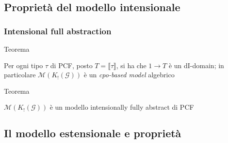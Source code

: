 \documentclass{beamer}
\begin{document}
\subsection{Proprietà del modello intensionale}

\begin{frame}
	
	\frametitle{Intensional full abstraction}
	
	
	\begin{block}{Teorema}
		
		Per ogni tipo $\tau$ di PCF, posto $T= \llbracket \tau \rrbracket$, si ha che $1 \rightarrow T$ è un dI-domain;
		in particolare $\mathcal{M}(K_! (\mathcal{G}) )$ è un \emph{cpo-based model} algebrico
		
	\end{block}
	
	
	\begin{block}{Teorema}
		
		$\mathcal{M}(K_! (\mathcal{G}) )$ è un modello intensionally fully abstract di PCF
		
	\end{block}
	
	
\end{frame}




\subsection{Il modello estensionale e proprietà}
\end{document}
